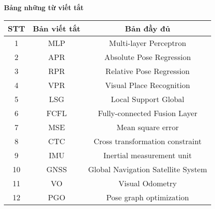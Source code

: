 \titlepage \null
	\small
	\begin{center}
	  {\bfseries Bảng những từ viết tắt\vspace{-.5em}}
	\end{center}
	\quotation
\begin{table}[h]
\centering
\begin{tabular}{|c|c|c|}
\hline
\textbf{STT} & \textbf{Bản viết tắt}                & \textbf{Bản đầy đủ}     \\ \hline
1            & MLP                  & Multi-layer Perceptron        \\ \hline
2            & APR                  & Absolute Pose Regression      \\ \hline
3            & RPR                  & Relative Pose Regression      \\ \hline
4            & VPR                  & Visual Place Recognition      \\ \hline
5            & LSG                  & Local Support Global          \\ \hline
6            & FCFL                 & Fully-connected Fusion Layer  \\ \hline
7            & MSE                  & Mean square error             \\ \hline
8            & CTC                  & Cross transformation constraint \\ \hline
9		& IMU		& Inertial measurement unit	\\ \hline
10		& GNSS		& Global Navigation Satellite System \\ \hline
11		& VO			& Visual Odometry	\\ \hline
12      & PGO       & Pose graph optimization   \\ \hline
\end{tabular}
\end{table}

